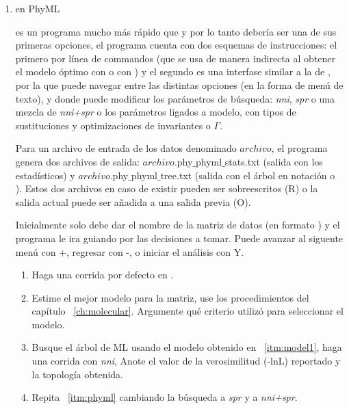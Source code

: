 \begin{enumerate}
\item{en PhyML}

 es un programa mucho m\'as r\'apido que  y  por lo tanto deber\'ia ser una de sus primeras opciones, el programa cuenta con dos esquemas de instrucciones: el primero por l\'inea de commandos (que se usa de manera indirecta al obtener el modelo \'optimo con  o con ) y el segundo es una interfase similar a la de , por la que puede navegar entre las distintas opciones (en la forma de men\'u de texto), y donde puede modificar los par\'ametros de b\'usqueda: \textit{nni}, \textit{spr} o una mezcla de \textit{nni+spr} o los par\'ametros ligados a modelo, con tipos de sustituciones y optimizaciones de invariantes o $\Gamma$.

Para un archivo de entrada de los datos denominado $archivo$, el programa genera dos archivos de salida: $archivo$.phy$\_$phyml$\_$stats.txt (salida con los  estad\'isticos) y $archivo$.phy$\_$phyml$\_$tree.txt (salida con  el \'arbol en notaci\'on  o ). Estos dos archivos en caso de existir pueden ser sobreescritos (R) o la salida actual puede ser a\~nadida a una salida previa (O).

Inicialmente solo debe dar el nombre de la matriz de datos (en formato ) y el programa le ira guiando por las decisiones a tomar. Puede avanzar al siguente men\'u con +, regresar con -, o iniciar el an\'alisis con Y.

	\begin{enumerate}
		\item Haga una corrida por defecto en .
		
		
		\item \label{itm:model1} Estime el mejor modelo para la matriz, use los procedimientos del cap\'itulo ~\ref{ch:molecular}. Argumente qu\'e criterio utiliz\'o para seleccionar el modelo.
		
		\item \label{itm:phyml} Busque el \'arbol de ML usando el modelo obtenido en ~\ref{itm:model1}, haga una corrida con \textit{nni},  Anote el valor de la verosimilitud (-lnL) reportado y la topolog\'ia obtenida.
		
		\item Repita ~\ref{itm:phyml} cambiando la b\'usqueda a \textit{spr} y a \textit{nni+spr}.
		

\end{enumerate}
\end{enumerate}
